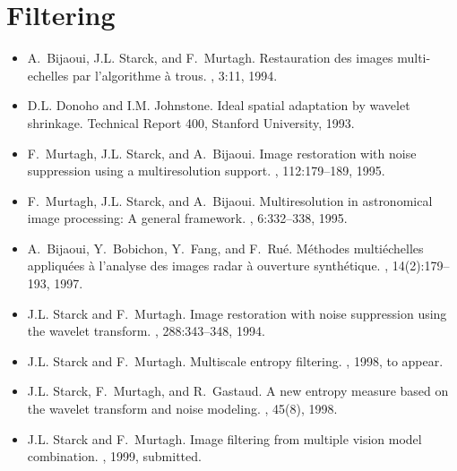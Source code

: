 \section{Filtering}
\begin{itemize}
\item  A.~Bijaoui, J.L. Starck, and F.~Murtagh.
\newblock Restauration des images multi-echelles par l'algorithme \`a trous.
, 3:11, 1994.

\item D.L. Donoho and I.M. Johnstone.
\newblock Ideal spatial adaptation by wavelet shrinkage.
\newblock Technical Report 400, Stanford University, 1993.

\item F.~Murtagh, J.L. Starck, and A.~Bijaoui.
\newblock Image restoration with noise suppression using a multiresolution
  support.
, 112:179--189, 1995.

\item F.~Murtagh, J.L. Starck, and A.~Bijaoui.
\newblock Multiresolution in astronomical image processing: A general
  framework.
,
  6:332--338, 1995.

\item A.~Bijaoui, Y.~Bobichon, Y.~Fang, and F.~Ru\'e.
\newblock M\'ethodes multi\'echelles appliqu\'ees \`a l'analyse des images
  radar \`a ouverture synth\'etique.
, 14(2):179--193, 1997.

\item J.L. Starck and F.~Murtagh.
\newblock Image restoration with noise suppression using the wavelet transform.
, 288:343--348, 1994.

\item J.L. Starck and F.~Murtagh.
\newblock Multiscale entropy filtering.
, 1998,
\newblock to appear.

\item J.L. Starck, F.~Murtagh, and R.~Gastaud.
\newblock A new entropy measure based on the wavelet transform and noise
  modeling.
, 45(8), 1998.

\item J.L. Starck and F.~Murtagh.
\newblock Image filtering from multiple vision model combination.
, 1999,
\newblock submitted.

\end{itemize}

